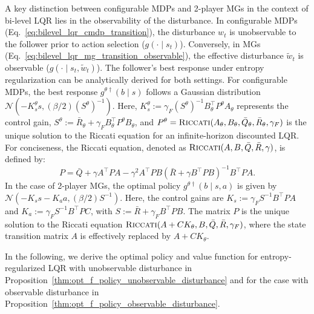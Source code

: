 \documentclass[letterpaper]{article} %
\begin{document}
A key distinction between configurable MDPs and 2-player MGs in the context of bi-level LQR lies in the observability of the disturbance. In configurable MDPs (Eq.~\eqref{eq:bilevel_lqr_cmdp_transition}), the disturbance $w_{t}$ is unobservable to the follower prior to action selection ($g(\cdot\mid s_{t})$). Conversely, in MGs (Eq.~\eqref{eq:bilevel_lqr_mg_transition_observable}), the effective disturbance $\tilde{w}_{t}$ is observable ($g(\cdot\mid s_{t},\tilde{w}_{t})$).
The follower's best response under entropy regularization can be analytically derived for both settings.
For configurable MDPs, the best response $g^{\theta\dag}(b \mid s)$ follows a Gaussian distribution $\mathcal{N}(- K_s^{\theta} s, (\beta / 2) (S^{\theta})^{-1})$. Here, $K_s^{\theta}:= \gamma_F (S^{\theta})^{-1} B_{\theta}^\top P^{\theta} A_{\theta}$ represents the control gain, $S^{\theta}:= \bar{R}_{\theta} + \gamma_F B_{\theta}^\top P^{\theta} B_{\theta}$, and $P^{\theta} = \text{\textsc{Riccati}}(A_{\theta}, B_{\theta}, \bar{Q}_{\theta}, \bar{R}_{\theta}, \gamma_F)$ is the unique solution to the Riccati equation for an infinite-horizon discounted LQR. 
For conciseness, the Riccati equation, denoted as $\text{\textsc{Riccati}}(A, B, \bar{Q}, \bar{R}, \gamma)$, is defined by:
\begin{equation}
P = \bar{Q} + \gamma A^\top P A - \gamma^2 A^\top P B (\bar{R} + \gamma B^\top P B)^{-1} B^\top P A .\label{eq:riccati_equation}
\end{equation}
In the case of 2-player MGs, the optimal policy $g^{\theta\dag}(b \mid s, a)$ is given by $\mathcal{N}(- K_s s - K_a a, (\beta / 2) S^{-1})$. Here, the control gains are $K_s := \gamma_F S^{-1} B^\top P A$ and $K_a := \gamma_F S^{-1} B^\top P C$, with $S := \bar{R} + \gamma_F B^\top P B$. The matrix $P$ is the unique solution to the Riccati equation $\text{\textsc{Riccati}}(A+C K_\theta, B, \bar{Q}, \bar{R}, \gamma_F)$, where the state transition matrix $A$ is effectively replaced by $A+C K_\theta$.

In the following, we derive the optimal policy and value function for entropy-regularized LQR with unobservable disturbance in Proposition~\ref{thm:opt_f_policy_unobservable_disturbance} and for the case with observable disturbance in Proposition~\ref{thm:opt_f_policy_observable_disturbance}.
\end{document}
